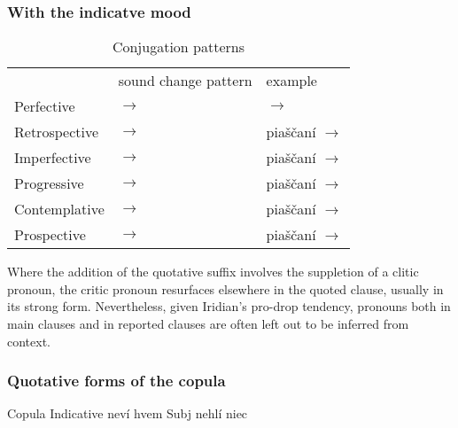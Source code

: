 \subsubsection{With the indicatve mood}

\begin{table}
	\small\centering
	\caption{Conjugation patterns}
	\label{tbl:quotind}
	\begin{tabu} to 0.8\textwidth {YYY}
		\toprule
										&	{\sc sound change pattern}				& {\sc example}\\
										\addlinespace
		\midrule
			\addlinespace
				Perfective 		&
				 $\rightarrow$ 	&
				 $\rightarrow$ \\
			\addlinespace
				Retrospective &
				 $\rightarrow$  &
				pia\v{s}\v{c}an\'i $\rightarrow$ \\
			\addlinespace
				Imperfective &
				 $\rightarrow$  &
				pia\v{s}\v{c}an\'i $\rightarrow$ \\
			\addlinespace
				Progressive &
				 $\rightarrow$  &
				pia\v{s}\v{c}an\'i $\rightarrow$ \\
			\addlinespace
				Contemplative &
				 $\rightarrow$  &
				pia\v{s}\v{c}an\'i $\rightarrow$ \\
			\addlinespace
				Prospective &
				 $\rightarrow$  &
				pia\v{s}\v{c}an\'i $\rightarrow$ \\

	\end{tabu}

\end{table}

Where the addition of the quotative suffix  involves the suppletion of a clitic pronoun, the critic pronoun resurfaces elsewhere in the quoted clause, usually in its strong form. Nevertheless, given Iridian's pro-drop tendency, pronouns both in main clauses and in reported clauses are often left out to be inferred from context.

\subsubsection{Quotative forms of the copula}

Copula
Indicative
nev\'i
hvem
Subj
nehl\'i
niec

